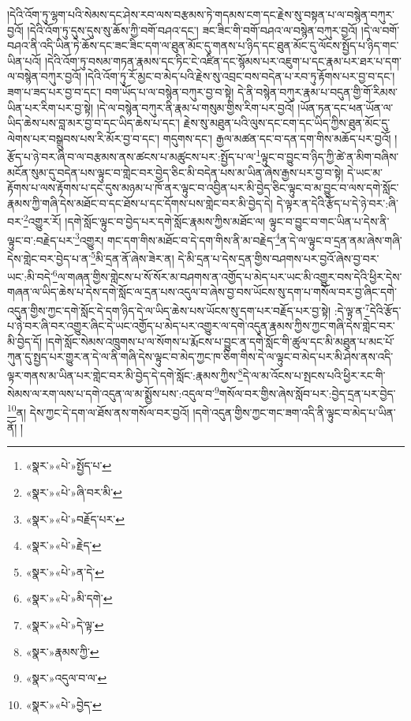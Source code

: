 །དེའི་འོག་ཏུ་ལྷག་པའི་སེམས་དང་ཤེས་རབ་ལས་བརྩམས་ཏེ་གདམས་ངག་དང་རྗེས་སུ་བསྟན་པ་ལ་བསྙེན་བཀུར་བྱའོ། །དེའི་འོག་ཏུ་དུས་དུས་སུ་ཆོས་ཀྱི་བགོ་བཤའ་དང་། ཟང་ཟིང་གི་བགོ་བཤའ་ལ་བསྙེན་བཀུར་བྱའོ། །དེ་ལ་བགོ་བཤའ་ནི་འདི་ཡིན་ཏེ་ཆོས་དང་ཟང་ཟིང་དག་ལ་ཐུན་མོང་དུ་གནས་པ་ཉིད་དང་ཐུན་མོང་དུ་ལོངས་སྤྱོད་པ་ཉིད་གང་ཡིན་པའོ། །དེའི་འོག་ཏུ་བསམ་གཏན་རྣམས་དང་ཏིང་ངེ་འཛིན་དང་སྙོམས་པར་འཇུག་པ་དང་རྣམ་པར་ཐར་པ་དག་ལ་བསྙེན་བཀུར་བྱའོ། །དེའི་འོག་ཏུ་རོ་མྱང་བ་མེད་པའི་རྗེས་སུ་འབྲང་བས་བདེན་པ་རབ་ཏུ་རྟོགས་པར་བྱ་བ་དང་། ཟག་པ་ཟད་པར་བྱ་བ་དང་། བག་ཡོད་པ་ལ་བསྙེན་བཀུར་བྱ་བ་སྟེ། དེ་ནི་བསྙེན་བཀུར་རྣམ་པ་བདུན་གྱི་གོ་རིམས་ཡིན་པར་རིག་པར་བྱ་སྟེ། །དེ་ལ་བསྙེན་བཀུར་ནི་རྣམ་པ་གསུམ་གྱིས་རིག་པར་བྱའོ། །ཡོན་ཏན་དང་ཕན་ཡོན་ལ་ཡིད་ཆེས་པས་བླ་མར་བྱ་བ་དང་ཡིད་ཆེས་པ་དང་། རྗེས་སུ་མཐུན་པའི་ལུས་དང་ངག་དང་ཡིད་ཀྱིས་ཐུན་མོང་དུ་ལེགས་པར་བསྒྲུབས་པས་རི་མོར་བྱ་བ་དང་། གདུགས་དང་། རྒྱལ་མཚན་དང་བ་དན་དག་གིས་མཆོད་པར་བྱའོ། །རྩོད་པ་ཉེ་བར་ཞི་བ་ལ་བརྩམས་ནས་ཚངས་པ་མཚུངས་པར་:སྤྱོད་པ་ལ་\footnote{«སྣར་»«པེ་»སྤྱོད་པ་}ལྟུང་བ་བྱུང་བ་ཉིད་ཀྱི་ཚེ་ན་མིག་བཞིས་མངོན་སུམ་དུ་བདེན་པས་ལྟུང་བ་གླེང་བར་བྱེད་ཅིང་མི་བདེན་པས་མ་ཡིན་ཞེས་རྒྱས་པར་བྱ་བ་སྟེ། དེ་ཡང་མ་རྟོགས་པ་ལས་རྟོགས་པ་དང་དུས་མཉམ་པ་ཁོ་ནར་ལྟུང་བ་འབྱིན་པར་མི་བྱེད་ཅིང་ལྟུང་བ་མ་བྱུང་བ་ལས་དགེ་སློང་རྣམས་ཀྱི་གཞི་དེས་མཐོང་བ་དང་ཐོས་པ་དང་དོགས་པས་གླེང་བར་མི་བྱེད་དེ། དེ་ལྟར་ན་དེའི་རྩོད་པ་དེ་ཉེ་བར་:ཞི་བར་\footnote{«སྣར་»«པེ་»ཞི་བར་མི་}འགྱུར་རོ། །དགེ་སློང་ལྟུང་བ་བྱེད་པར་དགེ་སློང་རྣམས་ཀྱིས་མཐོང་ལ། ལྟུང་བ་བྱུང་བ་གང་ཡིན་པ་དེས་ནི་ལྟུང་བ་:བརྗེད་པར་\footnote{«སྣར་»«པེ་»བརྗོད་པར་}འགྱུར། གང་དག་གིས་མཐོང་བ་དེ་དག་གིས་ནི་མ་བརྗེད་\footnote{«སྣར་»«པེ་»རྗེད་}ན་དེ་ལ་ལྟུང་བ་དྲན་ནམ་ཞེས་གཞི་དེས་གླེང་བར་བྱེད་པ་ན་\footnote{«སྣར་»«པེ་»ན་དེ་}མི་དྲན་ནོ་ཞེས་ཟེར་ན། དེ་མི་དྲན་པ་དེས་དྲན་གྱིས་བཤགས་པར་བྱའོ་ཞེས་བྱ་བར་ཡང་:མི་བདེ་\footnote{«སྣར་»«པེ་»མི་དགེ་}ལ་གཞན་གྱིས་གླེངས་པ་སོ་སོར་མ་བཤགས་ན་འགྱོད་པ་མེད་པར་ཡང་མི་འགྱུར་བས་དེའི་ཕྱིར་དེས་གཞན་ལ་ཡིད་ཆེས་པ་དེས་དགེ་སློང་ལ་དྲན་པས་འདུལ་བ་ཞེས་བྱ་བས་ཡོངས་སུ་དག་པ་གསོལ་བར་བྱ་ཞིང་དགེ་འདུན་གྱིས་ཀྱང་དགེ་སློང་དེ་དག་ཉིད་དེ་ལ་ཡིད་ཆེས་པས་ཡོངས་སུ་དག་པར་བརྗོད་པར་བྱ་སྟེ། :དེ་ལྟ་ན་\footnote{«སྣར་»«པེ་»དེ་ལྟ་}དེའི་རྩོད་པ་ཉེ་བར་ཞི་བར་འགྱུར་ཞིང་དེ་ཡང་འགྱོད་པ་མེད་པར་འགྱུར་ལ་དགེ་འདུན་རྣམས་ཀྱིས་ཀྱང་གཞི་དེས་གླེང་བར་མི་བྱེད་དོ། །དགེ་སློང་སེམས་འཁྲུགས་པ་ལ་སོགས་པ་རྨོངས་པ་བྱུང་ན་དགེ་སློང་གི་ཚུལ་དང་མི་མཐུན་པ་མང་པོ་ཀུན་དུ་སྤྱད་པར་གྱུར་ན་དེ་ལ་ནི་གཞི་དེས་ལྟུང་བ་མེད་ཀྱང་ཁ་ཅིག་གིས་དེ་ལ་ལྟུང་བ་མེད་པར་མི་ཤེས་ནས་འདི་ལྟར་གནས་མ་ཡིན་པར་གླེང་བར་མི་བྱེད་དེ་དགེ་སློང་:རྣམས་ཀྱིས་\footnote{«སྣར་»རྣམས་ཀྱི་}དེ་ལ་མ་འོངས་པ་སྤངས་པའི་ཕྱིར་རང་གི་སེམས་ལ་རག་ལས་པ་དགེ་འདུན་ལ་མ་སྨྱོས་པས་:འདུལ་བ་\footnote{«སྣར་»འདུལ་བ་ལ་}གསོལ་བར་གྱིས་ཞེས་སློབ་པར་:བྱེད་དྲན་པར་བྱེད་\footnote{«སྣར་»«པེ་»བྱེད་}ན། དེས་ཀྱང་དེ་དག་ལ་ཐོས་ནས་གསོལ་བར་བྱའོ། །དགེ་འདུན་གྱིས་ཀྱང་གང་ཟག་འདི་ནི་ལྟུང་བ་མེད་པ་ཡིན་ནོ། །
